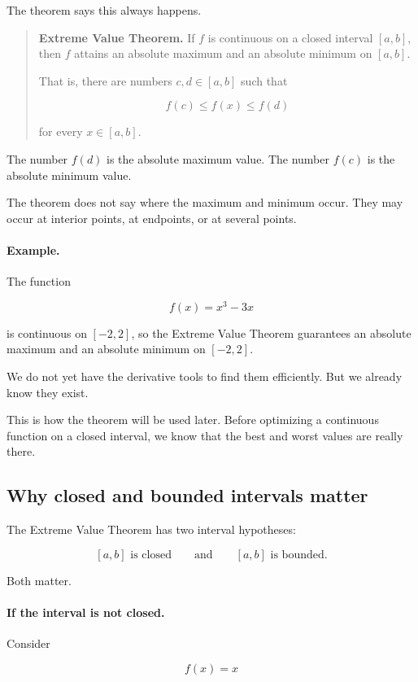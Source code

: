 The theorem says this always happens.

\begin{quote}
\textbf{Extreme Value Theorem.}
If \(f\) is continuous on a closed interval \([a,b]\), then \(f\) attains an absolute maximum and an absolute minimum on \([a,b]\).

That is, there are numbers \(c,d\in[a,b]\) such that

\[
f(c)\le f(x)\le f(d)
\]

for every \(x\in[a,b]\).
\end{quote}

The number \(f(d)\) is the absolute maximum value.  The number \(f(c)\) is the absolute minimum value.

The theorem does not say where the maximum and minimum occur.  They may occur at interior points, at endpoints, or at several points.

\paragraph{Example.}
The function

\[
f(x)=x^3-3x
\]

is continuous on \([-2,2]\), so the Extreme Value Theorem guarantees an absolute maximum and an absolute minimum on \([-2,2]\).

We do not yet have the derivative tools to find them efficiently.  But we already know they exist.

This is how the theorem will be used later.  Before optimizing a continuous function on a closed interval, we know that the best and worst values are really there.

\subsection{Why closed and bounded intervals matter}
\label{subsec:closed-bounded-matter}

The Extreme Value Theorem has two interval hypotheses:

\[
[a,b]\text{ is closed}
\qquad\text{and}\qquad
[a,b]\text{ is bounded}.
\]

Both matter.

\paragraph{If the interval is not closed.}
Consider

\[
f(x)=x
\]

